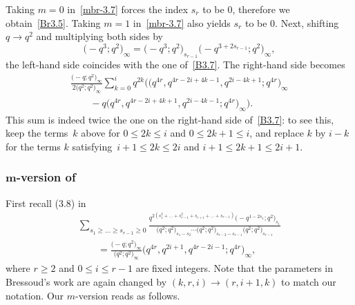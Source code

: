 \documentclass[pdftex]{sigma}
\numberwithin{equation}{section}
\begin{document}
 Taking $m=0$ in~\eqref{mbr-3.7} forces the index $s_r$ to be $0$, therefore we obtain~\eqref{Br3.5}. Taking $m=1$ in~\eqref{mbr-3.7} also yields $s_r$ to be $0$. Next, shifting $q\to q^2$ and multiplying both sides by
\begin{equation*}
\bigl(-q^3;q^2\bigr)_\infty=\bigl(-q^3;q^2\bigr)_{s_{r-1}}\bigl(-q^{3+2s_{r-1}};q^2\bigr)_\infty,
\end{equation*}
the left-hand side coincides with the one of~\eqref{B3.7}. The right-hand side becomes
\begin{gather*}
\frac{\bigl(-q;q^2\bigr)_\infty}{2\bigl(q^2;q^2\bigr)_\infty}\sum_{k=0}^iq^{2k}\bigl(\bigl(q^{4r},q^{4r-2i+4k-1},q^{2i-4k+1};q^{4r}\bigr)_\infty
\\
\qquad{}-q\bigl(q^{4r},q^{4r-2i+4k+1},q^{2i-4k-1};q^{4r}\bigr)_\infty\bigr).
\end{gather*}
This sum is indeed twice the one on the right-hand side of~\eqref{B3.7}: to see this, keep the terms~$k$ above for $0\leq 2k\leq i$ and $0\leq 2k+1\leq i$, and replace $k$ by $i-k$ for the terms $k$ satisfying~${i+1\leq 2k\leq 2i}$ and $i+1\leq 2k+1\leq 2i+1$.


\subsubsection[m-version of Ref. 13, equation (3.8)]{$\boldsymbol{m}$-version of~\cite[equation (3.8)]{Br80}}
First recall (3.8) in~\cite{Br80}
\begin{gather}
\sum_{s_1\geq\dots\geq s_{r-1}\geq0}\frac{q^{2(s_1^2+\dots+s_{r-1}^2+s_{i+1}+\dots+s_{r-1})}\bigl(-q^{1-2s_{1}};q^2\bigr)_{s_1}}{\bigl(q^2;q^2\bigr)_{s_1-s_2}
\cdots\bigl(q^2;q^2\bigr)_{s_{r-2}-s_{r-1}}\bigl(q^2;q^2\bigr)_{s_{r-1}}}\nonumber\\
\qquad=\frac{\bigl(-q;q^2\bigr)_\infty}{\bigl(q^2;q^2\bigr)_\infty}\bigl(q^{4r},q^{2i+1},q^{4r-2i-1};q^{4r}\bigr)_\infty,\label{B3.8}
\end{gather}
where $r\geq 2$ and $0\leq i\leq r-1$ are fixed integers. Note that the parameters in Bressoud's work are again changed by $(k,r,i)\to(r,i+1,k)$ to match our notation. Our $m$-version reads as follows.
\end{document}
